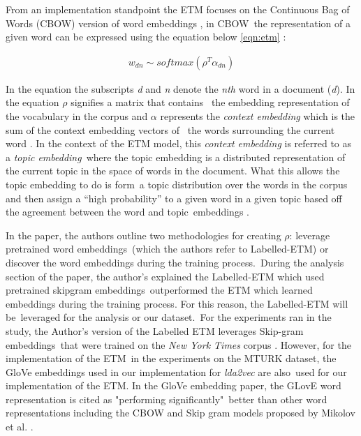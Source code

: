 \documentclass[letterpaper,12pt]{article}
\begin{document}
From an implementation standpoint the ETM focuses on the Continuous Bag of Words (CBOW) version of word embeddings \cite{mikolov2013distributed}, in CBOW\
the representation of a given word can be expressed using the equation below \ref{eqn:etm} \cite{dieng2019topic}: 

\begin{eqnarray}
	\label{eqn:etm}
	w_{dn} \sim softmax(\rho^T\alpha_{dn})
\end{eqnarray}

In the equation the subscripts \emph{d} and \emph{n} denote the \emph{n\-th} word in a document (\emph{d}). In the equation $\rho$ signifies a matrix that contains \
the embedding representation of the vocabulary in the corpus and $\alpha$ represents the \emph{context embedding} which is the sum of the context embedding vectors of \
the words surrounding the current word \cite{dieng2019topic}. In the context of the ETM model, this \emph{context embedding} is referred to as a \emph{topic embedding}\
where the topic embedding is a distributed representation of the current topic in the space of words in the document. What this allows the topic embedding to do is form\
a topic distribution over the words in the corpus and then assign a ``high probability'' to a given word in a given topic based off the agreement between the word and topic\
embeddings \cite{dieng2019topic}.

In the paper, the authors outline two methodologies for creating $\rho$: leverage pretrained word embeddings\
(which the authors refer to Labelled-ETM) or discover the word embeddings during the training process.\
During the analysis section of the paper, the author's explained the Labelled-ETM which used pretrained skipgram embeddings\
outperformed the ETM which learned embeddings during the training process. For this reason, the Labelled-ETM will be\
leveraged for the analysis or our dataset.\
For the experiments ran in the study, the Author's version of the Labelled ETM leverages Skip-gram embeddings\
that were trained on the \emph{New York Times} corpus \cite{sandhaus2008nyt}. However, for the implementation of the ETM\
in the experiments on the MTURK dataset, the GloVe embeddings \cite{pennington2014glove} used in our implementation for \emph{lda2vec} are also\
used for our implementation of the ETM. In the GloVe embedding paper, the GLovE word representation is cited as "performing significantly"\
better than other word representations including the CBOW and Skip gram models proposed by Mikolov et al. \cite{pennington2014glove}.
\end{document}
